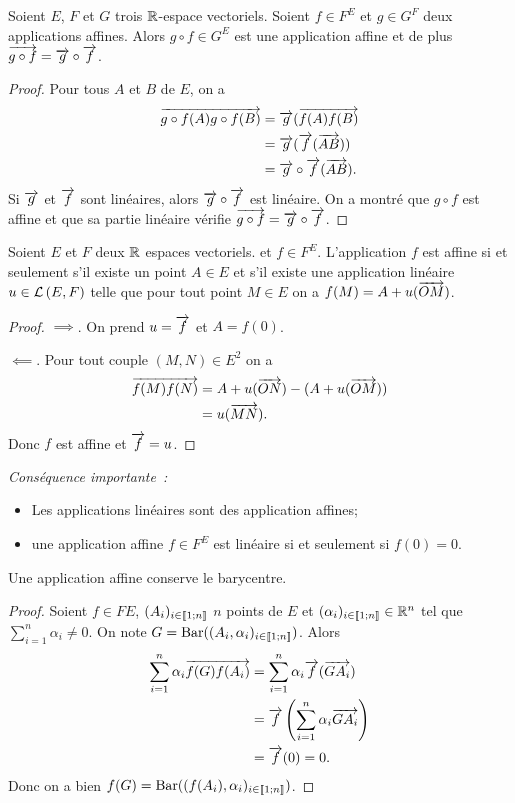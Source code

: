 \begin{prop}
  Soient $E$, $F$ et $G$ trois $\mathbb{R}$-espace vectoriels. Soient $f \in F^E$ et $g \in G^F$ deux applications affines. Alors $g \circ f \in G^E$ est une application affine et de plus $\overrightarrow{g \circ f}=\overrightarrow{g}\circ \overrightarrow{f}$.
\end{prop}
\begin{proof}
  Pour tous $A$ et $B$ de $E$, on a
  \begin{align}
    \overrightarrow{g\circ f(A) g\circ f(B)} &= \overrightarrow{g} (\overrightarrow{f(A)f(B)} \\
    &=\overrightarrow{g}(\overrightarrow{f}(\overrightarrow{AB})) \\
    &=\overrightarrow{g}\circ \overrightarrow{f} (\overrightarrow{AB}).
  \end{align}
  Si $\overrightarrow{g}$ et $\overrightarrow{f}$ sont linéaires, alors $\overrightarrow{g}\circ \overrightarrow{f}$ est linéaire. On a montré que $g \circ f$ est affine et que sa partie linéaire vérifie $\overrightarrow{g \circ f}=\overrightarrow{g}\circ \overrightarrow{f}$.
\end{proof}

\begin{prop}
  Soient $E$ et $F$ deux $\mathbb{R}$ espaces vectoriels. et $f \in F^E$. L'application $f$ est affine si et seulement s'il existe un point $A\in E$ et s'il existe une application linéaire $u \in \mathcal{L}\left(E,F\right)$ telle que pour tout point $M \in E$ on a $f(M)=A+u(\overrightarrow{OM})$.
\end{prop}
\begin{proof}
  $\implies$. On prend $u=\overrightarrow{f}$ et $A=f(0)$.

  $\impliedby$. Pour tout couple $(M, N) \in E^2$ on a
  \begin{align}
    \overrightarrow{f(M)f(N)} &= A+u(\overrightarrow{ON}) - (A+u(\overrightarrow{OM})) \\
    &=u(\overrightarrow{MN}).
  \end{align}
  Donc $f$ est affine et $\overrightarrow{f}=u$.
\end{proof}

\emph{Conséquence importante~:}
\begin{itemize}
\item Les applications linéaires sont des application affines;
\item une application affine $f \in F^E$ est linéaire si et seulement si $f(0)=0$.
\end{itemize}

\begin{prop}
  Une application affine conserve le barycentre.
\end{prop}
\begin{proof}
  Soient $f \in FE$, $(A_i)_{i \in \mathopen{\llbracket}1\mathclose{}\mathpunct{};n\mathclose{\rrbracket}}$ $n$ points de $E$ et $(\alpha_i)_{i \in \mathopen{\llbracket}1\mathclose{}\mathpunct{};n\mathclose{\rrbracket}} \in \mathbb{R}^n$ tel que $\sum_{i=1}^n\alpha_i\neq 0$. On note $G=\operatorname{Bar}((A_i,\alpha_i)_{i \in \mathopen{\llbracket}1\mathclose{}\mathpunct{};n\mathclose{\rrbracket}})$. Alors
  \begin{align}
    \sum_{i=1}^n \alpha_i \overrightarrow{f(G)f(A_i)} &= \sum_{i=1}^n \alpha_i \overrightarrow{f}(\overrightarrow{GA_i}) \\
    &=\overrightarrow{f}\left(\sum_{i=1}^n \alpha_i \overrightarrow{GA_i}\right) \\
    &=\overrightarrow{f}(0)=0.
  \end{align}
  Donc on a bien $f(G)=\operatorname{Bar}((f(A_i),\alpha_i)_{i \in \mathopen{\llbracket}1\mathclose{}\mathpunct{};n\mathclose{\rrbracket}})$.
\end{proof}

